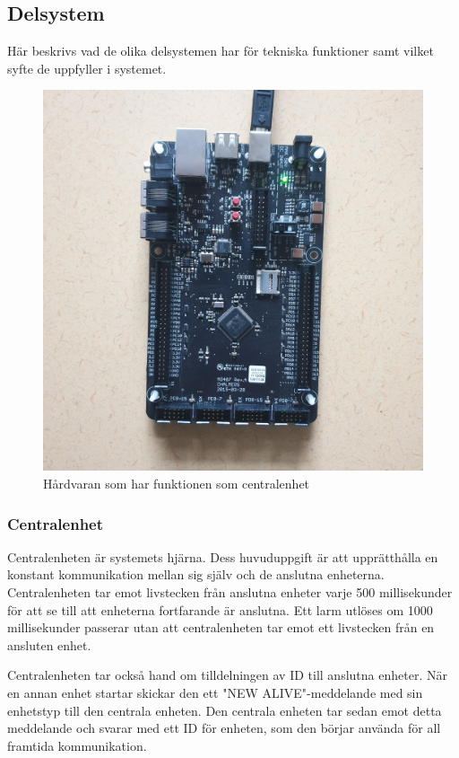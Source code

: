\documentclass{article}
\begin{document}
\subsection{Delsystem}
Här beskrivs vad de olika delsystemen har för tekniska funktioner samt vilket syfte de uppfyller i systemet.

\begin{figure}[h]
    \centering
    \includegraphics[scale=0.05]{Projektrapport/central.png}
    \caption {Hårdvaran som har funktionen som centralenhet}
    \label{fig:drawing}
\end{figure}

\subsubsection{Centralenhet}
Centralenheten är systemets hjärna. Dess huvuduppgift är att upprätthålla en konstant kommunikation mellan sig själv och de anslutna enheterna. Centralenheten tar emot livstecken från anslutna enheter varje 500 millisekunder för att se till att enheterna fortfarande är anslutna. Ett larm utlöses om 1000 millisekunder passerar utan att centralenheten tar emot ett livstecken från en ansluten enhet.


Centralenheten tar också hand om tilldelningen av ID till anslutna enheter. När en annan enhet startar skickar den ett "NEW ALIVE"-meddelande med sin enhetstyp till den centrala enheten. Den centrala enheten tar sedan emot detta meddelande och svarar med ett ID för enheten, som den börjar använda för all framtida kommunikation.
\end{document}
